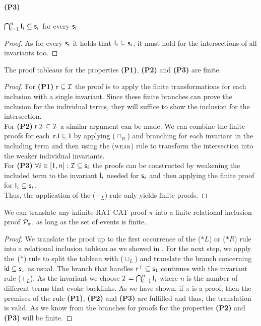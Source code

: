 \documentclass[a4paper,twoside,12pt, english]{article}
\begin{document}
\paragraph{(P3)} $\bigcap_{i = 1}^n \textsf{\upshape I}_i \subseteq \textsf{\upshape s}_i$ for every $\textsf{\upshape s}_i$
\begin{proof}
As for every $\textsf{\upshape s}_i$ it holds that $\textsf{\upshape I}_i \subseteq \textsf{\upshape s}_i$, it must hold for the intersections of all invariants too.
\end{proof}

\begin{lemma}\label{lem:properties} The proof tableaus for the properties \textbf{\upshape (P1)}, \textbf{\upshape (P2)} and \textbf{\upshape (P3)} are finite. \end{lemma}
\begin{proof}
For \textbf{(P1)} $\textsf{\upshape r} \subseteq \mathcal{I}$ the proof is to apply the finite transformations for each inclusion with a single invariant. Since these finite branches can prove the inclusion for the individual terms, they will suffice to show the inclusion for the intersection. \\
For \textbf{(P2)} $\textsf{\upshape r}.\mathcal{I} \subseteq \mathcal{I}$ a similar argument can be made. We can combine the finite proofs for each~$\textsf{\upshape r}.\textsf{\upshape I} \subseteq \textsf{\upshape I}$ by applying ($\cap_R$) and branching for each invariant in the including term and then using the (\textsc{weak}) rule to transform the intersection into the weaker individual invariants. \\
For \textbf{(P3)} $\forall i \in [1,n]: \mathcal{I} \subseteq \textsf{\upshape s}_i$ the proofs can be constructed by weakening the included term to the invariant $\textsf{\upshape I}_i$ needed for $\textsf{\upshape s}_i$ and then applying the finite proof for $\textsf{\upshape I}_i \subseteq \textsf{\upshape s}_i$. \\
Thus, the application of the ($+_L$) rule only yields finite proofs.
\end{proof}

\newpage
\begin{theorem}
We can translate any infinite RAT-CAT proof $\pi$ into a finite relational inclusion proof $\mathcal{P}_\pi$, as long as the set of events is finite.
\end{theorem}
\begin{proof}
We translate the proof up to the first occurrence of the ($*L$) or ($*R$) rule into a relational inclusion tableau as we showed in . For the next step, we apply the~($*$) rule to split the tableau with ($\cup_{L}$) and translate the branch concerning $\textsf{\upshape id} \subseteq \textsf{\upshape s}_1$ as usual. The branch that handles $\textsf{\upshape r}^+ \subseteq \textsf{\upshape s}_1$ continues with the invariant rule ($+_L$). As the invariant we choose $\mathcal{I} = \bigcap_{i = 1}^n \textsf{\upshape I}_i$ where $n$ is the number of different terms that evoke backlinks. As we have shown, if $\pi$ is a proof, then the premises of the rule \textbf{(P1)}, \textbf{(P2)} and \textbf{(P3)} are fulfilled and thus, the translation is valid. 
As we know from  the branches for proofs for the properties \textbf{(P2)} and \textbf{(P3)} will be finite.
\end{proof}
\end{document}
